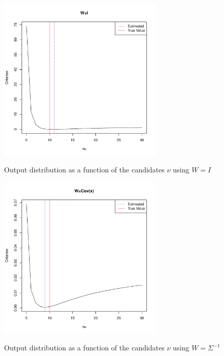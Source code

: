 \begin{figure}
    \centering
    \includegraphics[width=0.7\textwidth]{t-returns_criterion_(W=I).pdf}
    \label{t-returns_criterion_I}
    \caption{Output distribution as a function of the candidates $\nu$ using $W=I$}
    \includegraphics[width=0.7\textwidth]{t-returns_criterion_(W=Sigma^-1).pdf}
    \label{t-returns_criterion_W}
    \caption{Output distribution as a function of the candidates $\nu$ using $W=\Sigma^{-1}$}
\end{figure}


